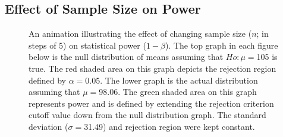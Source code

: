 \documentclass[10pt,openany]{book}\usepackage[]{graphicx}\usepackage[]{color}
\newenvironment{knitrout}{}{} %
\begin{document}
\subsection{Effect of Sample Size on Power}
\begin{knitrout}
\color{fgcolor}





































\begin{figure}[hbtp]

{\centering {}

}

\caption[An animation illustrating the effect of changing sample size ($n$]{An animation illustrating the effect of changing sample size ($n$; in steps of 5) on statistical power ($1-\beta$).  The top graph in each figure below is the null distribution of means assuming that $Ho:\mu=$105 is true.  The red shaded area on this graph depicts the rejection region defined by $\alpha=$0.05.  The lower graph is the actual distribution assuming that $\mu=$98.06.  The green shaded area on this graph represents power and is defined by extending the rejection criterion cutoff value down from the null distribution graph.  The standard deviation ($\sigma=$31.49) and rejection region were kept constant.}\label{fig:pwrAnimN}
\end{figure}


\end{knitrout}

\newpage
\end{document}
